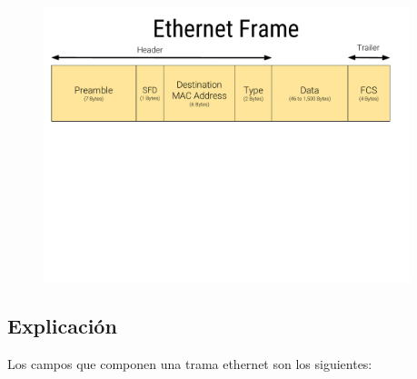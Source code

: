 \documentclass[12pt, fleqn]{report}                             %
\theoremstyle{break}                                            %
\begin{document}
            \begin{figure}[h]
                \centering
                \includegraphics[width=0.95\textwidth]{Ethernet-Header}
            \end{figure}

            \subsection{Explicación}

                Los campos que componen una trama ethernet son los siguientes: 
\end{document}
